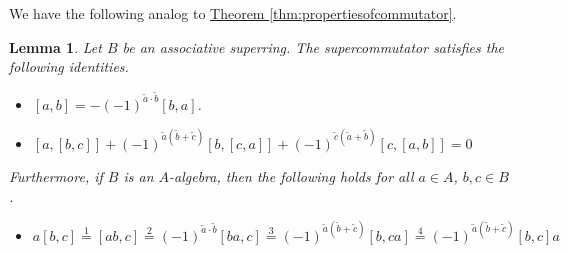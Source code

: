\documentclass[a4paper,10pt]{scrreprt}
\theoremstyle{definition}
\theoremstyle{plain}
\newtheorem{lemma}{Lemma}[section]
\theoremstyle{remark}
\begin{document}
We have the following analog to \hyperref[thm:propertiesofcommutator]{Theorem \ref*{thm:propertiesofcommutator}}.
\begin{lemma}
  Let $B$ be an associative superring. The supercommutator satisfies the following identities.
  \begin{itemize}
    \item $[a,b] = -(-1)^{\tilde{a}\cdot \tilde{b}}[b,a]$.
    \item $[a,[b,c]] + (-1)^{\tilde{a}(\tilde{b} + \tilde{c})}[b,[c,a]] + (-1)^{\tilde{c}(\tilde{a}+\tilde{b})}[c,[a,b]] = 0$
  \end{itemize}
  Furthermore, if $B$ is an $A$-algebra, then the following holds for all $a \in A$, $b,c \in B$.
  \begin{itemize}
    \item $a[b,c] \overset{1}{=} [ab,c] \overset{2}{=} (-1)^{\tilde{a}\cdot \tilde{b}}[ba,c] \overset{3}{=} (-1)^{\tilde{a}(\tilde{b} + \tilde{c})}[b,ca] \overset{4}{=} (-1)^{\tilde{a}(\tilde{b} + \tilde{c})}[b,c]a$
  \end{itemize}
\end{lemma}
\end{document}
